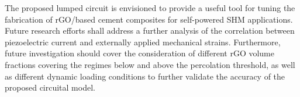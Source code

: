 \documentclass[a4paper,fleqn]{cas-sc}
\begin{document}
The proposed lumped circuit is envisioned to provide a useful tool for tuning the fabrication of rGO/based cement composites for self-powered SHM applications. Future research efforts shall address a further analysis of the correlation between piezoelectric current and externally applied mechanical strains. Furthermore, future investigation should cover the consideration of different rGO volume fractions covering the regimes below and above the percolation threshold, as well as different dynamic loading conditions to further validate the accuracy of the proposed circuital model. 




\end{document}

